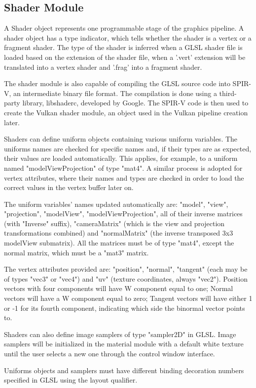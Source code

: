 \subsection{Shader Module}
A Shader object represents one programmable stage of the graphics pipeline. A shader object has a type indicator, which tells whether the shader is a vertex or a fragment shader. The type of the shader is inferred when a GLSL shader file is loaded based on the extension of the shader file, when a '.vert' extension will be translated into a vertex shader and '.frag' into a fragment shader.

The shader module is also capable of compiling the GLSL source code into SPIR-V, an intermediate binary file format. The compilation is done using a third-party library, libshaderc, developed by Google. The SPIR-V code is then used to create the Vulkan shader module, an object used in the Vulkan pipeline creation later.

Shaders can define uniform objects containing various uniform variables. The uniforms names are checked for specific names and, if their types are as expected, their values are loaded automatically. This applies, for example, to a uniform named "modelViewProjection" of type "mat4". A similar process is adopted for vertex attributes, where their names and types are checked in order to load the correct values in the vertex buffer later on.

The uniform variables' names updated automatically are: "model", "view", "projection", "modelView", "modelViewProjection", all of their inverse matrices (with "Inverse" suffix), "cameraMatrix" (which is the view and projection transformations combined) and "normalMatrix" (the inverse transposed 3x3 modelView submatrix). All the matrices must be of type "mat4", except the normal matrix, which must be a "mat3" matrix.

The vertex attributes provided are: "position", "normal", "tangent" (each may be of types "vec3" or "vec4") and "uv" (texture coordinates, always "vec2"). Position vectors with four components will have W component equal to one; Normal vectors will have a W component equal to zero; Tangent vectors will have either 1 or -1 for its fourth component, indicating which side the binormal vector points to.

Shaders can also define image samplers of type "sampler2D" in GLSL. Image samplers will be initialized in the material module with a default white texture until the user selects a new one through the control window interface.

Uniforms objects and samplers must have different binding decoration numbers specified in GLSL using the layout qualifier.

